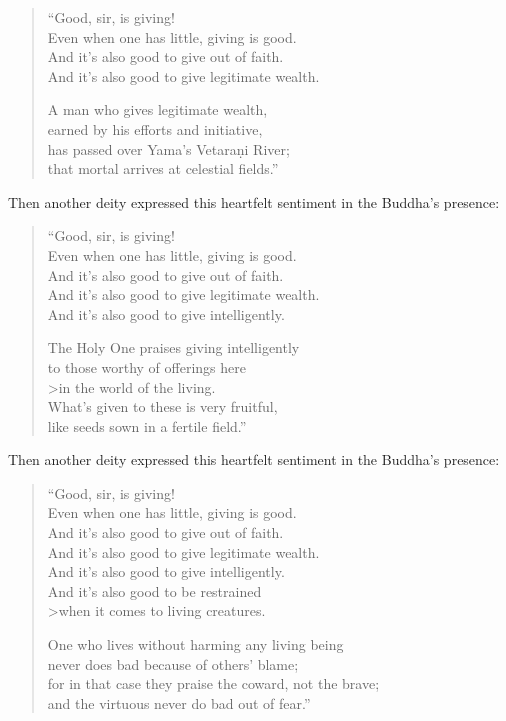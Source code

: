 \documentclass[12pt,openany]{book}%
\begin{document}
\begin{verse}%
“Good, sir, is giving! \\
Even when one has little, giving is good. \\
And it’s also good to give out of faith. \\
And it’s also good to give legitimate wealth. 

A man who gives legitimate wealth, \\
earned by his efforts and initiative, \\
has passed over Yama’s \textsanskrit{Vetaraṇi} River; \\
that mortal arrives at celestial fields.” 

%
\end{verse}

Then another deity expressed this heartfelt sentiment in the Buddha’s presence: 

\begin{verse}%
“Good, sir, is giving! \\
Even when one has little, giving is good. \\
And it’s also good to give out of faith. \\
And it’s also good to give legitimate wealth. \\
And it’s also good to give intelligently. 

The Holy One praises giving intelligently \\
to those worthy of offerings here  \\>in the world of the living. \\
What’s given to these is very fruitful, \\
like seeds sown in a fertile field.” 

%
\end{verse}

Then another deity expressed this heartfelt sentiment in the Buddha’s presence: 

\begin{verse}%
“Good, sir, is giving! \\
Even when one has little, giving is good. \\
And it’s also good to give out of faith. \\
And it’s also good to give legitimate wealth. \\
And it’s also good to give intelligently. \\
And it’s also good to be restrained  \\>when it comes to living creatures. 

One who lives without harming any living being \\
never does bad because of others’ blame; \\
for in that case they praise the coward, not the brave; \\
and the virtuous never do bad out of fear.” 

%
\end{verse}
\end{document}
